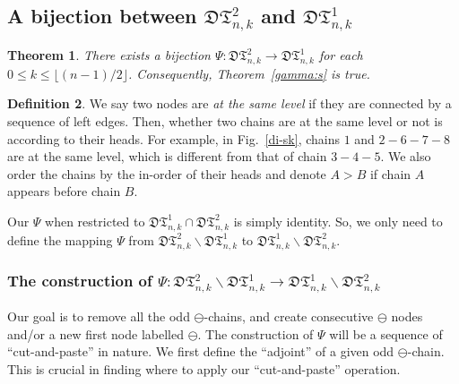 \documentclass[12pt]{amsart}
\numberwithin{equation}{section}
\theoremstyle{plain}
\newtheorem{theorem}{Theorem}[section]
\theoremstyle{definition}
\newtheorem{Def}[theorem]{Definition}
\def\D{\mathfrak{D}}
\def\T{\mathfrak{T}}
\begin{document}
\subsection{A bijection between $\D\T_{n,k}^{2}$ and $\D\T_{n,k}^{1}$}%
 
\begin{theorem}\label{gammabij}
There exists a bijection $\Psi:\D\T_{n,k}^{2}\rightarrow\D\T_{n,k}^{1}$ for each $0\leq k\leq\lfloor(n-1)/2\rfloor$. Consequently, Theorem~\ref{gamma:s} is true.
\end{theorem}

\begin{Def}
We say two nodes are {\em at the same level} if they are connected by a sequence of left edges. Then, whether two chains are at the same level or not is according to their heads. For example, in Fig.~\ref{di-sk},  chains $1$ and $2-6-7-8$ are at the same level, which is different from that of chain $3-4-5$.  We also order the chains by the in-order of their heads and denote $A>B$ if chain $A$ appears before  chain $B$. 
\end{Def}

Our $\Psi$ when restricted to $\D\T^{1}_{n,k}\cap \D\T^{2}_{n,k}$ is simply identity. So, we only need to define the mapping $\Psi$ from  $\D\T^{2}_{n,k}\backslash \D\T^{1}_{n,k}$ to $\D\T^{1}_{n,k}\backslash \D\T^{2}_{n,k}$. 



\subsubsection{The construction of $\Psi:\D\T^{2}_{n,k}\backslash \D\T^{1}_{n,k}\rightarrow\D\T^{1}_{n,k}\backslash \D\T^{2}_{n,k}$}%

Our goal is to remove all the odd $\ominus$-chains, and create consecutive $\ominus$ nodes and/or a new first node labelled $\ominus$. The construction of $\Psi$ will be a sequence of ``cut-and-paste'' in nature. We first define the ``adjoint'' of a given odd $\ominus$-chain. This is crucial in finding where to apply our ``cut-and-paste'' operation.
\end{document}
